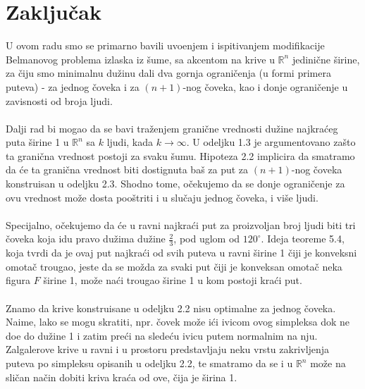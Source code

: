\documentclass[11pt]{article}
\begin{document}
\section[Zaklju\v cak]{Zaklju\v cak}
\bigskip
U ovom radu smo se primarno bavili uvo\dj enjem i ispitivanjem modifikacije Belmanovog problema izlaska iz \v sume, sa akcentom na krive u $\mathbb{R}^n$ jedini\v cne \v sirine, za \v ciju smo minimalnu du\v zinu dali dva gornja ograni\v cenja (u formi primera puteva) - za jednog \v coveka i za $(n+1)$-nog \v coveka, kao i donje ograni\v cenje u zavisnosti od broja ljudi.
\\
\\
\indent Dalji rad bi mogao da se bavi tra\v zenjem grani\v cne vrednosti du\v zine najkra\' ceg puta \v sirine 1 u $\mathbb{R}^n$ sa $k$ ljudi, kada $k\to \infty$. U odeljku 1.3 je argumentovano za\v sto ta grani\v cna vrednost postoji za svaku \v sumu. Hipoteza 2.2 implicira da smatramo da \' ce ta grani\v cna vrednost biti dostignuta ba\v s za put za $(n+1)$-nog \v coveka konstruisan u odeljku 2.3. Shodno tome, o\v cekujemo da se donje ograni\v cenje za ovu vrednost mo\v ze dosta poo\v striti i u slu\v caju jednog \v coveka, i vi\v se ljudi.
\\
\\
\indent Specijalno, o\v cekujemo da \' ce u ravni najkra\' ci put za proizvoljan broj ljudi biti tri \v coveka koja idu pravo du\v zima du\v zine $\frac{2}{3}$, pod uglom od $120^\circ$. Ideja teoreme 5.4, koja tvrdi da je ovaj put najkra\' ci od svih puteva u ravni \v sirine 1 \v ciji je konveksni omota\v c trougao, jeste da se mo\v zda za svaki put \v ciji je konveksan omota\v c neka figura $F$ \v sirine 1, mo\v ze na\' ci trougao \v sirine 1 u kom postoji kra\' ci put.
\\
\\
\indent Znamo da krive konstruisane u odeljku 2.2 nisu optimalne za jednog \v coveka. Naime, lako se mogu skratiti, npr. \v covek mo\v ze i\' ci ivicom ovog simpleksa dok ne do\dj e do du\v zine 1 i zatim pre\' ci na slede\' cu ivicu putem normalnim na nju. Zalgalerove krive u ravni i u prostoru predstavljaju neku vrstu zakrivljenja puteva po simpleksu opisanih u odeljku 2.2, te smatramo da se i u $\mathbb{R}^n$ mo\v ze na sli\v can na\v cin dobiti kriva kra\' ca od ove, \v cija je \v sirina 1.
\bigskip
\bigskip
\end{document}
